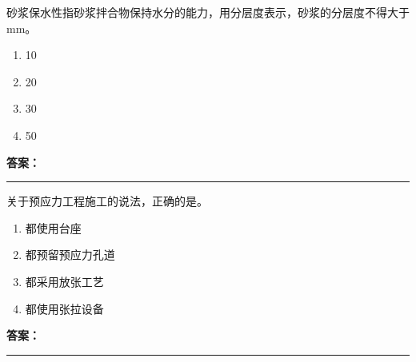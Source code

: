 \documentclass[UTF8,fontset=fandol,11pt]{ctexart}
\newcommand{\answerline}{\textcolor{answerred}{\rule{2.4cm}{0.7pt}}}
\begin{document}
\begin{quizbox}[title={乱序第 77 题｜第六章砌筑工程}]

砂浆保水性指砂浆拌合物保持水分的能力，用分层度表示，砂浆的分层度不得大于 mm。\\

\begin{enumerate}[label=\Alph*.]

\item 10

\item 20

\item 30

\item 50

\end{enumerate}

\textbf{\textcolor{answerred}{答案：}} \answerline

\end{quizbox}

\vspace{0.2em}

\begin{quizbox}[title={乱序第 78 题｜第五章预应力混凝土工程}]

关于预应力工程施工的说法，正确的是。\\

\begin{enumerate}[label=\Alph*.]

\item 都使用台座

\item 都预留预应力孔道

\item 都采用放张工艺

\item 都使用张拉设备

\end{enumerate}

\textbf{\textcolor{answerred}{答案：}} \answerline

\end{quizbox}

\vspace{0.2em}
\end{document}
